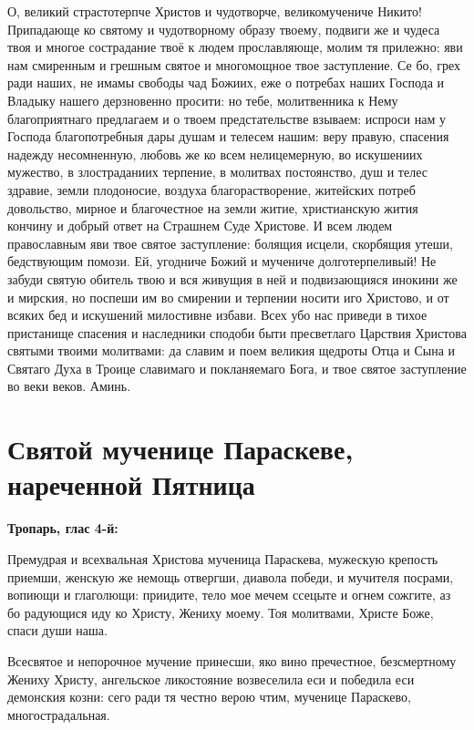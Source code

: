 О, великий страстотерпче Христов и чудотворче, великомучениче Никито! Припадающе ко святому и чудотворному образу твоему, подвиги же и чудеса твоя и многое сострадание твоё к людем прославляюще, молим тя прилежно: яви нам смиренным и грешным святое и многомощное твое заступление. Се бо, грех ради наших, не имамы свободы чад Божиих, еже о потребах наших Господа и Владыку нашего дерзновенно просити: но тебе, молитвенника к Нему благоприятнаго предлагаем и о твоем предстательстве взываем: испроси нам у Господа благопотребныя дары душам и телесем нашим: веру правую, спасения надежду несомненную, любовь же ко всем нелицемерную, во искушениих мужество, в злостраданиих терпение, в молитвах постоянство, душ и телес здравие, земли плодоносие, воздуха благорастворение, житейских потреб довольство, мирное и благочестное на земли житие, христианскую жития кончину и добрый ответ на Страшнем Суде Христове. И всем людем православным яви твое святое заступление: болящия исцели, скорбящия утеши, бедствующим помози. Ей, угодниче Божий и мучениче долготерпеливый! Не забуди святую обитель твою и вся живущия в ней и подвизающияся инокини же и мирския, но поспеши им во смирении и терпении носити иго Христово, и от всяких бед и искушений милостивне избави. Всех убо нас приведи в тихое пристанище спасения и наследники сподоби быти пресветлаго Царствия Христова святыми твоими молитвами: да славим и поем великия щедроты Отца и Сына и Святаго Духа в Троице славимаго и покланяемаго Бога, и твое святое заступление во веки веков. Аминь. \mychapterending


 

\section{Святой мученице Параскеве, нареченной Пятница}
 
\bfseries Тропарь, глас 4-й:\normalfont{}


Премудрая и всехвальная Христова мученица Параскева, мужескую крепость приемши, женскую же немощь отвергши, диавола победи, и мучителя посрами, вопиющи и глаголющи: приидите, тело мое мечем ссецыте и огнем сожгите, аз бо радующися иду ко Христу, Жениху моему. Тоя молитвами, Христе Боже, спаси души наша.




Всесвятое и непорочное мучение принесши, яко вино пречестное, безсмертному Жениху Христу, ангельское ликостояние возвеселила еси и победила еси демонския козни: сего ради тя честно верою чтим, мученице Параскево, многострадальная.


